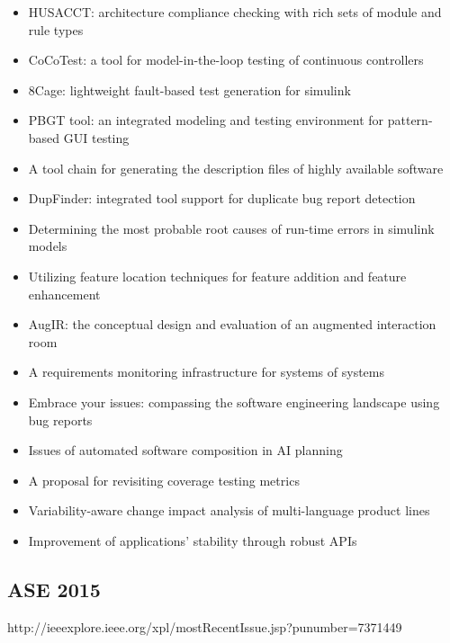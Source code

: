 {\begin{itemize}[itemsep=-1ex]
  \item HUSACCT: architecture compliance checking with rich sets of module and rule types
  \item CoCoTest: a tool for model-in-the-loop testing of continuous controllers
  \item 8Cage: lightweight fault-based test generation for simulink
  \item PBGT tool: an integrated modeling and testing environment for pattern-based GUI testing
  \item A tool chain for generating the description files of highly available software
  \item DupFinder: integrated tool support for duplicate bug report detection
  \item Determining the most probable root causes of run-time errors in simulink models
  \item Utilizing feature location techniques for feature addition and feature enhancement
  \item AugIR: the conceptual design and evaluation of an augmented interaction room
  \item A requirements monitoring infrastructure for systems of systems
  \item Embrace your issues: compassing the software engineering landscape using bug reports
  \item Issues of automated software composition in AI planning
  \item A proposal for revisiting coverage testing metrics
  \item Variability-aware change impact analysis of multi-language product lines
  \item Improvement of applications' stability through robust APIs
\end{itemize}
}

\subsection{ASE 2015}

http://ieeexplore.ieee.org/xpl/mostRecentIssue.jsp?punumber=7371449

